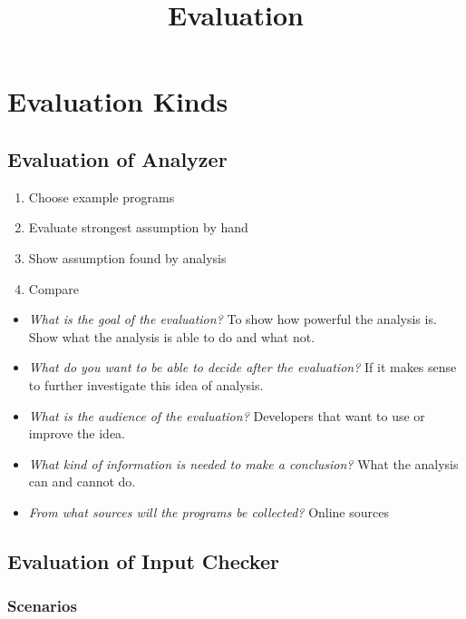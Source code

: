 \documentclass[11pt]{article}
\begin{document}
\title{Evaluation}

\maketitle


\section{Evaluation Kinds}

\subsection{Evaluation of Analyzer}

\begin{enumerate}
    \item Choose example programs
    \item Evaluate strongest assumption by hand
    \item Show assumption found by analysis
    \item Compare
\end{enumerate}

\begin{itemize}
  \item \textit{What is the goal of the evaluation?} To show how powerful the analysis is. Show what the analysis is able to do and what not.
  \item \textit{What do you want to be able to decide after the evaluation?} If it makes sense to further investigate this idea of analysis.
  \item \textit{What is the audience of the evaluation?} Developers that want to use or improve the idea.
  \item \textit{What kind of information is needed to make a conclusion?} What the analysis can and cannot do.
  \item \textit{From what sources will the programs be collected?} Online sources
\end{itemize}

\subsection{Evaluation of Input Checker}

\subsubsection{Scenarios}
\end{document}
